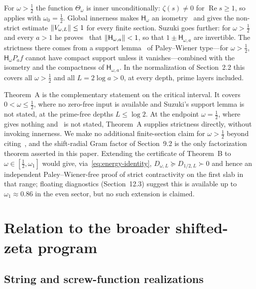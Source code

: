 \documentclass[11pt,a4paper]{article}
\renewcommand{\Re}{\operatorname{Re}}
\newcommand{\Hsf}{\mathsf H}
\DeclarePairedDelimiter{\norm}{\lVert}{\rVert}
\theoremstyle{plain}
\theoremstyle{definition}
\numberwithin{equation}{section}
\begin{document}
For $\omega>\tfrac12$ the function $\Theta_\omega$ is inner unconditionally:
$\zeta(s)\neq0$ for $\Re s\ge1$, so~\cite[Prop.~1.2]{Suzuki2012} applies with
$\omega_0=\tfrac12$. Global innerness makes $\Hsf_\omega$ an
isometry~\cite[Lemma~4.1]{Suzuki2012} and gives the non-strict estimate
$\norm{V_{\omega,L}}\le1$ for every finite section. Suzuki goes further:
for $\omega>\tfrac12$ and every $a>1$ he proves~\cite[Lemma~4.4]{Suzuki2012}
that $\norm{\Hsf_{\omega,a}}<1$, so that $1\pm\Hsf_{\omega,a}$ are invertible.
The strictness there comes from a support lemma~\cite[Lemma~4.3]{Suzuki2012}
of Paley--Wiener type---for $\omega>\tfrac12$, $\Hsf_\omega P_af$ cannot have
compact support unless it vanishes---combined with the isometry and the
compactness of $\Hsf_{\omega,a}$. In the normalization of Section~2.2 this
covers all $\omega>\tfrac12$ and all $L=2\log a>0$, at every depth, prime
layers included.

Theorem~A is the complementary statement on the critical interval. It covers
$0<\omega\le\tfrac12$, where no zero-free input is available and Suzuki's
support lemma is not stated, at the prime-free depths $L\le\log2$. At the
endpoint $\omega=\tfrac12$, where~\cite[Prop.~1.2]{Suzuki2012} gives nothing
and~\cite[Lemma~4.4]{Suzuki2012} is not stated, Theorem~A supplies
strictness directly, without invoking innerness. We make no additional
finite-section claim for $\omega>\tfrac12$ beyond citing~\cite{Suzuki2012},
and the shift-radial Gram factor of Section~9.2 is the only factorization
theorem asserted in this paper. Extending the certificate of Theorem~B to
$\omega\in[\tfrac12,\omega_1]$ would give, via~\eqref{eq:energy-identity},
$D_{\omega,L}\succeq D_{1/2,L}\succ0$ and hence an independent
Paley--Wiener-free proof of strict contractivity on the first slab in that
range; floating diagnostics (Section~12.3) suggest this is available up to
$\omega_1\approx0.86$ in the even sector, but no such extension is claimed.

\section{Relation to the broader shifted-zeta program}

\subsection{String and screw-function realizations}
\end{document}

